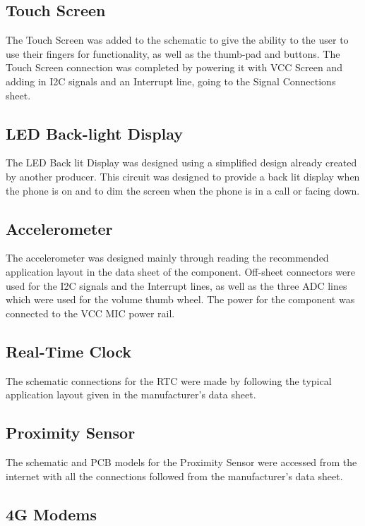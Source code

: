 \subsection{Touch Screen}
\label{chap:touch}

	The Touch Screen was added to the schematic to give the ability to the user to use their fingers for functionality, as well as the thumb-pad and buttons. 
The Touch Screen connection was completed by powering it with VCC Screen and adding in I2C signals and an Interrupt line, going to the Signal Connections sheet.

\subsection{LED Back-light Display}

	The LED Back lit Display was designed using a simplified design already created by another producer. This circuit was designed to provide a back lit display when the phone is on and to dim the screen when the phone is in a call or facing down.

\subsection{Accelerometer}
\label{chap:a}

	The accelerometer was designed mainly through reading the recommended application layout in the data sheet of the component. Off-sheet connectors were used for the I2C signals and the Interrupt lines, as well as the three ADC lines which were used for the volume thumb wheel. The power for the component was connected to the VCC MIC power rail.

\subsection{Real-Time Clock}
\label{chap:RTC}

	The schematic connections for the RTC were made by following the typical application layout given in the manufacturer's data sheet.

\subsection{Proximity Sensor}
\label{chap:prox}
	The schematic and PCB models for the Proximity Sensor were accessed from the internet with all the connections followed from the manufacturer's data sheet. 

\subsection{4G Modems}
\label{chap:modem}

